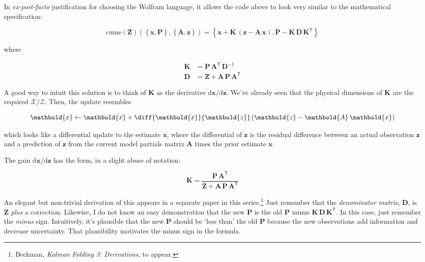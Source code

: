 \documentclass[10pt,oneside,x11names]{article}
\begin{document}
In \emph{ex-post-facto} justification for choosing the Wolfram language,
it allows the code above to look very similar to the
mathematical specification:

\begin{equation}
\label{eqn:kalman-cume-definition}
\text{cume}
\left(
\mathbold{Z}
\right)
\left(
\left\{
\mathbold{x},
\mathbold{P}
\right\},
\left\{
\mathbold{A},
\mathbold{z}
\right\}
\right) =
\left\{
\mathbold{x}+
\mathbold{K}\,
\left(
\mathbold{z}-
\mathbold{A}\,
\mathbold{x}
\right),
\mathbold{P}-
\mathbold{K}\,
\mathbold{D}\,
\mathbold{K}^{\mathsf{T}}
\right\}
\end{equation}

\noindent where

\begin{align}
\label{eqn:kalman-gain-definition}
\mathbold{K}
&=
\mathbold{P}\,
\mathbold{A}^{\mathsf{T}}\,
\mathbold{D}^{-1} \\
\label{eqn:kalman-denominator-definition}
\mathbold{D}
&= \mathbold{Z} +
\mathbold{A}\,
\mathbold{P}\,
\mathbold{A}^{\mathsf{T}}
\end{align}

A good way to intuit this solution is to think of \(\mathbold{K}\) as the derivative
\(\text{d}\mathbold{x}/\text{d}\mathbold{z}\). We've already seen that the
physical dimensions of \(\mathbold{K}\) are the required
\(\mathcal{X}/\mathcal{Z}\). Then, the update resembles

\begin{equation}
\mathbold{x}
\leftarrow
\mathbold{x} +
\diff{\mathbold{x}}{\mathbold{z}}
\left(
\mathbold{z}-
\mathbold{A}\,
\mathbold{x}
\right)
\end{equation}

\noindent which looks like a differential update to the estimate
\(\mathbold{x}\), where the differential of \(\mathbold{z}\) is the residual
difference between an actual observation \(\mathbold{z}\) and a prediction of
\(\mathbold{z}\) from the current model partials matrix \(\mathbold{A}\) times the
prior estimate \(\mathbold{x}\).

The gain \(\text{d}\mathbold{x}/\text{d}\mathbold{z}\) has the form, in a slight
abuse of notation:

\begin{equation}
\mathbold{K}=
\frac{
\mathbold{P}\,
\mathbold{A}^{\mathsf{T}}
}{
\mathbold{Z}+
\mathbold{A}\,
\mathbold{P}\,
\mathbold{A}^{\mathsf{T}}
}
\end{equation}

An elegant but non-trivial derivation of this appears in a separate paper in this
series.\footnote{Beckman, \emph{Kalman Folding 3: Derivations}, to appear.}
Just remember that the \emph{denominator matrix},
\(\mathbold{D}\), is \(\mathbold{Z}\) \emph{plus} a correction. Likewise, I do not know
an easy demonstration that the new \(\mathbold{P}\) is the old \(\mathbold{P}\)
minus \(\mathbold{K}\,\mathbold{D}\,\mathbold{K}^{\mathsf{T}}\). In this case, just
remember the \emph{minus} sign. Intuitively, it's plausible that the new
\(\mathbold{P}\) should be `less than' the old \(\mathbold{P}\) because the new
observations add information and decrease uncertainty. That plausibility
motivates the minus sign in the formula.
\end{document}
